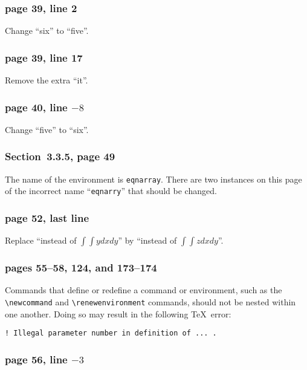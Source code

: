 \subsubsection*{page 39, line 2}
 
Change ``six'' to ``five''.
 
\subsubsection*{page 39, line 17}
Remove the extra ``it''.
 
\subsubsection*{page 40, line $-8$}
Change ``five'' to ``six''.
 
\subsubsection*{Section~3.3.5, page 49}
The name of the environment is {\tt eqnarray}.  There are two instances
on this page of the incorrect name ``{\tt eqnarry}'' that should be
changed.
 
 
\subsubsection*{page 52, last line}
 
Replace ``instead of $\int\int ydxdy$'' by 
``instead of $\int\int zdxdy$''.
 
\subsubsection*{pages 55--58, 124, and 173--174}
 
Commands that define or redefine a command or environment, such as the
\linebreak
\hbox{\verb|\newcommand|} and \hbox{\verb|\renewenvironment|} commands,
should not be nested within one another.  Doing so may result in the
following \TeX\ error:
\begin{verbatim}
! Illegal parameter number in definition of ... .
\end{verbatim}
 
\subsubsection*{page 56, line $-3$}
 
